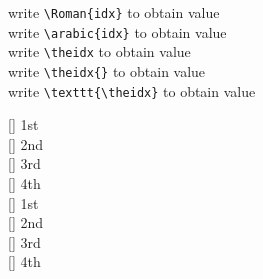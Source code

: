 \documentclass{article}
\newenvironment{alltt}{\ttfamily}{\par}
\begin{document}
\setcounter{idx}{20}

write \verb|\Roman{idx}| to obtain  value \\ write
\verb|\arabic{idx}| to obtain  value \\ write \verb|\theidx| to
obtain \theidx value \\ write \verb|\theidx{}| to obtain \theidx{} value
\\ write \verb|\texttt{\theidx}| to obtain \texttt{\theidx} value

\vspace{10pt}
\begin{alltt}
   {[\theidx]} 1st \\
   {[\theidx]} 2nd \\
   {[\theidx]} 3rd \\
   {[\theidx]} 4th \\
  \setcounter{idx}{123} {[]} 1st \\
   {[]} 2nd \\
   {[]} 3rd \\
   {[]} 4th
\end{alltt}
\end{document}
